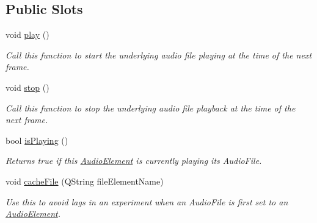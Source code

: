 \subsection*{Public Slots}
\begin{DoxyCompactItemize}
\item 
\hypertarget{class_picto_1_1_audio_element_a7f0539817be5838b8f5208d3e3e1030c}{void \hyperlink{class_picto_1_1_audio_element_a7f0539817be5838b8f5208d3e3e1030c}{play} ()}\label{class_picto_1_1_audio_element_a7f0539817be5838b8f5208d3e3e1030c}

\begin{DoxyCompactList}\small\item\em Call this function to start the underlying audio file playing at the time of the next frame. \end{DoxyCompactList}\item 
\hypertarget{class_picto_1_1_audio_element_a9960f41ed8077abd3efed9a71c84926b}{void \hyperlink{class_picto_1_1_audio_element_a9960f41ed8077abd3efed9a71c84926b}{stop} ()}\label{class_picto_1_1_audio_element_a9960f41ed8077abd3efed9a71c84926b}

\begin{DoxyCompactList}\small\item\em Call this function to stop the underlying audio file playback at the time of the next frame. \end{DoxyCompactList}\item 
\hypertarget{class_picto_1_1_audio_element_abd8ca491891c38bc24c9b43dee687640}{bool \hyperlink{class_picto_1_1_audio_element_abd8ca491891c38bc24c9b43dee687640}{is\-Playing} ()}\label{class_picto_1_1_audio_element_abd8ca491891c38bc24c9b43dee687640}

\begin{DoxyCompactList}\small\item\em Returns true if this \hyperlink{class_picto_1_1_audio_element}{Audio\-Element} is currently playing its Audio\-File. \end{DoxyCompactList}\item 
void \hyperlink{class_picto_1_1_audio_element_ab2c332184602c8bb3db0c7775641a2b7}{cache\-File} (Q\-String file\-Element\-Name)
\begin{DoxyCompactList}\small\item\em Use this to avoid lags in an experiment when an Audio\-File is first set to an \hyperlink{class_picto_1_1_audio_element}{Audio\-Element}. \end{DoxyCompactList}\end{DoxyCompactItemize}
